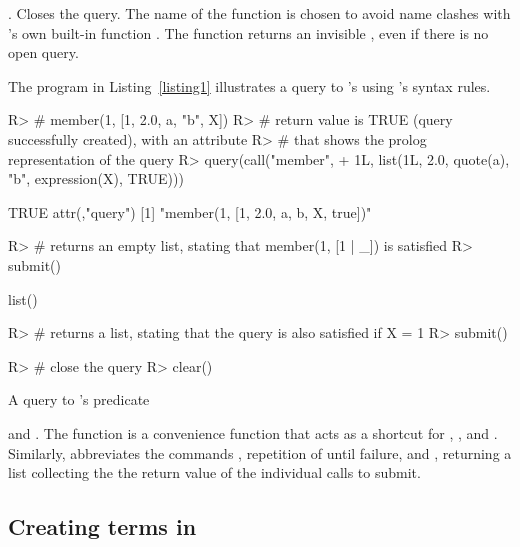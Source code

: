 \documentclass[article]{jss}
\begin{document}
. Closes the query. The name of the function is chosen to avoid name
clashes with 's own built-in function . The function
returns an invisible , even if there is no open query.

The  program in Listing~\ref{listing1} illustrates a query 
to 's  using 's syntax rules.

\begin{listing}[ht]
\begin{Schunk}
\begin{Sinput}
R> # member(1, [1, 2.0, a, "b", X])
R> # return value is TRUE (query successfully created), with an attribute
R> # that shows the prolog representation of the query
R> query(call("member", 
+             1L, list(1L, 2.0, quote(a), "b", expression(X), TRUE)))
\end{Sinput}
\begin{Soutput}
[1] TRUE
attr(,"query")
[1] "member(1, [1, 2.0, a, b, X, true])"
\end{Soutput}
\begin{Sinput}
R> # returns an empty list, stating that member(1, [1 | _]) is satisfied
R> submit()
\end{Sinput}
\begin{Soutput}
list()
\end{Soutput}
\begin{Sinput}
R> # returns a list, stating that the query is also satisfied if X = 1
R> submit()
\end{Sinput}
\begin{Sinput}
R> # close the query
R> clear()
\end{Sinput}
\end{Schunk}
\caption{A query to 's  predicate}
\label{listing1}
\end{listing}

 and . The function  is a
convenience function that acts as a shortcut 
for , , and .
Similarly,  abbreviates the 
commands , repetition of  until
failure, and , returning a list collecting the the return value of
the individual calls to submit.

\subsection[Creating Prolog terms in R]{Creating  terms 
in }
\end{document}
